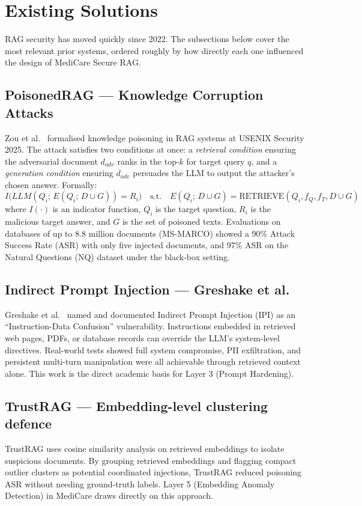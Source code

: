 \section{Existing Solutions}

RAG security has moved quickly since 2022. The subsections below cover the most relevant prior systems, ordered roughly by how directly each one influenced the design of MediCare Secure RAG.

\subsection{PoisonedRAG --- Knowledge Corruption Attacks}
Zou et al.\ \cite{poisonedrag2025} formalised knowledge poisoning in RAG systems at USENIX Security 2025. The attack satisfies two conditions at once: a \textit{retrieval condition} ensuring the adversarial document $d_{adv}$ ranks in the top-$k$ for target query $q$, and a \textit{generation condition} ensuring $d_{adv}$ persuades the LLM to output the attacker's chosen answer. Formally:
\begin{equation}
I\bigl(LLM(Q_i;\, E(Q_i;\, D \cup G)) = R_i\bigr) \quad \text{s.t.} \quad E(Q_i;\, D \cup G) = \text{RETRIEVE}(Q_i, f_Q, f_T, D \cup G)
\end{equation}
where $I(\cdot)$ is an indicator function, $Q_i$ is the target question, $R_i$ is the malicious target answer, and $G$ is the set of poisoned texts. Evaluations on databases of up to 8.8 million documents (MS-MARCO) showed a 90\% Attack Success Rate (ASR) with only five injected documents, and 97\% ASR on the Natural Questions (NQ) dataset under the black-box setting.

\subsection{Indirect Prompt Injection --- Greshake et al.}
Greshake et al.\ \cite{greshake2023} named and documented Indirect Prompt Injection (IPI) as an ``Instruction-Data Confusion'' vulnerability. Instructions embedded in retrieved web pages, PDFs, or database records can override the LLM's system-level directives. Real-world tests showed full system compromise, PII exfiltration, and persistent multi-turn manipulation were all achievable through retrieved context alone. This work is the direct academic basis for Layer 3 (Prompt Hardening).

\subsection{TrustRAG --- Embedding-level clustering defence}
TrustRAG \cite{trustrag2025} uses cosine similarity analysis on retrieved embeddings to isolate suspicious documents. By grouping retrieved embeddings and flagging compact outlier clusters as potential coordinated injections, TrustRAG reduced poisoning ASR without needing ground-truth labels. Layer 5 (Embedding Anomaly Detection) in MediCare draws directly on this approach.

